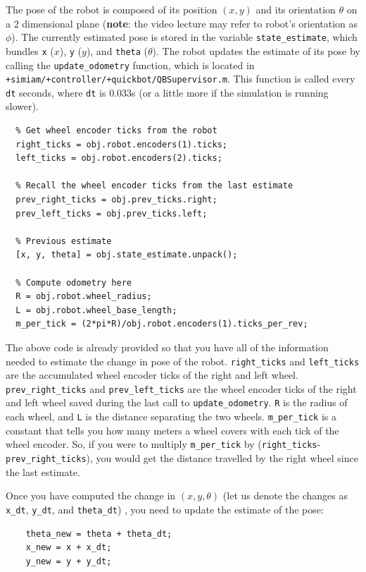 \documentclass[10pt]{article}
\begin{document}
\begin{enumerate}
 The pose of the robot is composed of its position $(x,y)$ and its orientation $\theta$ on a 2 dimensional plane (\textbf{note}: the video lecture may refer to robot's orientation as $\phi$). The currently estimated pose is stored in the variable \texttt{state\_estimate}, which bundles \texttt{x} ($x$), \texttt{y} ($y$), and \texttt{theta} ($\theta$). The robot updates the estimate of its pose by calling the \texttt{update\_odometry} function, which is located in \texttt{+simiam/+controller/+quickbot/QBSupervisor.m}. This function is called every \texttt{dt} seconds, where \texttt{dt} is $0.033$s (or a little more if the simulation is running slower).
 \begin{verbatim}  
  % Get wheel encoder ticks from the robot
  right_ticks = obj.robot.encoders(1).ticks;
  left_ticks = obj.robot.encoders(2).ticks;

  % Recall the wheel encoder ticks from the last estimate
  prev_right_ticks = obj.prev_ticks.right;
  prev_left_ticks = obj.prev_ticks.left;

  % Previous estimate 
  [x, y, theta] = obj.state_estimate.unpack();

  % Compute odometry here
  R = obj.robot.wheel_radius;
  L = obj.robot.wheel_base_length;
  m_per_tick = (2*pi*R)/obj.robot.encoders(1).ticks_per_rev;\end{verbatim}
  The above code is already provided so that you have all of the information needed to estimate the change in pose of the robot. \texttt{right\_ticks} and \texttt{left\_ticks} are the accumulated wheel encoder ticks of the right and left wheel. \texttt{prev\_right\_ticks} and \texttt{prev\_left\_ticks} are the wheel encoder ticks of the right and left wheel saved during the last call to \texttt{update\_odometry}. \texttt{R} is the radius of each wheel, and \texttt{L} is the distance separating the two wheels. \texttt{m\_per\_tick} is a constant that tells you how many meters a wheel covers with each tick of the wheel encoder. So, if you were to multiply \texttt{m\_per\_tick} by (\texttt{right\_ticks}-\texttt{prev\_right\_ticks}), you would get the distance travelled by the right wheel since the last estimate.
  
  Once you have computed the change in $(x,y,\theta)$ (let us denote the changes as \texttt{x\_dt}, \texttt{y\_dt}, and \texttt{theta\_dt}) , you need to update the estimate of the pose:
  \begin{verbatim}
    theta_new = theta + theta_dt;
    x_new = x + x_dt;
    y_new = y + y_dt;\end{verbatim}
 

\end{enumerate}
\end{document}
